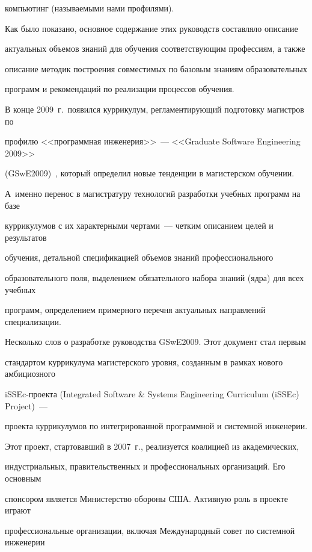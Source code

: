 компьютинг (называемыми нами профилями). 



Как было показано, основное содержание этих руководств составляло описание 

актуальных объемов знаний для обучения соответствующим профессиям, а также 

описание методик построения совместимых по базовым знаниям образовательных 

программ и рекомендаций по реализации процессов обучения. 



В конце 2009~г.\ появился куррикулум, регламентирующий подготовку ма\-гист\-ров по 

профилю <<программная инженерия>>~--- <<Graduate Software Engineering 2009>> 

(GSwE2009)~\cite{19-s}, который определил новые тенденции в магистерском обучении. 

А~именно перенос в магистратуру технологий разработки учебных программ на базе 

куррикулумов с их характерными чертами~--- четким описанием целей и результатов 

обучения, детальной спецификацией объемов знаний профессионального 

образовательного поля, выделением обязательного набора знаний (ядра) для всех учебных 

программ, определением примерного перечня актуальных направлений специализации.



Несколько слов о разработке руководства GSwE2009. Этот документ стал первым 

стандартом куррикулума магистерского уровня, созданным в рамках нового амбициозного 

iSSEc-про\-ек\-та (Integrated Software \& Systems Engineering Curriculum (iSSEc) Project)~--- 

проекта куррикулумов по интегрированной программной и системной инженерии.



Этот проект, стартовавший в 2007~г., реализуется коалицией из академических, 

индустриальных, правительственных и профессиональных организаций. Его основным 

спонсором является Министерство обороны США. Активную роль в проекте играют 

профессиональные организации, включая Международный совет по системной инженерии 

